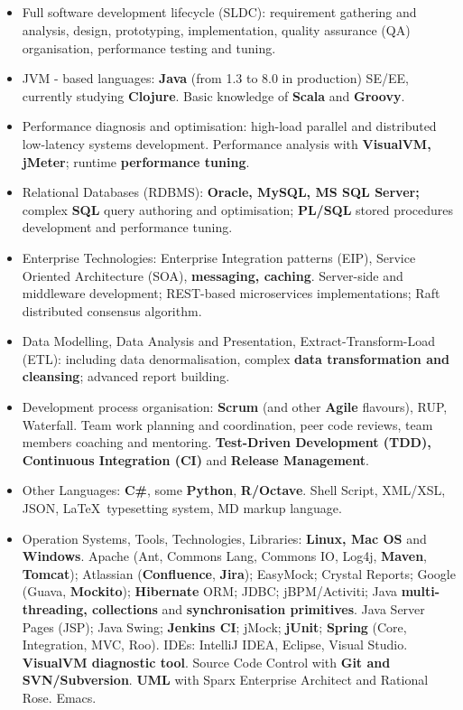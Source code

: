 \documentclass{res}
\newcommand{\osection}[1]{\section{\sc {\Large \textbf{#1}\\}} \vspace{0.30cm}}
\newcommand{\profileItem}[2]{\item {\sc #1:} #2.}
\newcommand{\emp}[1]{{\bf#1}}
\newif\ifFullVersion
\begin{document}
\begin{resume}
\osection{Technical Profile}
\vspace{0.20cm}
\begin{itemize}
  \profileItem {Full software development lifecycle (SLDC)} {requirement gathering and analysis, design, prototyping, implementation, quality assurance (QA) organisation, performance testing and tuning}
\ifFullVersion
  \profileItem {Development process organisation} {\emp{Scrum} (and other \emp{Agile} flavours), RUP, Waterfall. Team work planning and coordination, peer code reviews, team members coaching and mentoring. \emp{Continuous Integration (CI)} and \emp{Release Management}}
\fi
  \profileItem {JVM - based languages} {\emp{Java} (from 1.3 to 8.0 in production) SE/EE, currently studying \emp{Clojure}. Basic knowledge of \emp{Scala} and \emp{Groovy}}
  \profileItem{Performance diagnosis and optimisation} {high-load parallel and distributed low-latency systems development. Performance analysis with \emp{VisualVM, jMeter}; runtime \emp{performance tuning}}
  \profileItem {Relational Databases (RDBMS)} {\emp{Oracle, MySQL, MS SQL Server;} complex \emp{SQL} query authoring and optimisation; \emp{PL/SQL} stored procedures development and performance tuning}
  \profileItem{Enterprise Technologies} {Enterprise Integration patterns (EIP), Service Oriented Architecture (SOA), \emp{messaging, caching}. Server-side and middleware development; REST-based microservices implementations; Raft distributed consensus algorithm}
  \profileItem{Data Modelling, Data Analysis and Presentation, Extract-Transform-Load (ETL)} {including data denormalisation, complex \emp{data transformation and cleansing}; advanced report building}
\ifFullVersion
Strong interest in \emp{functional programming}, Data Science and Machine Learning / Business Intelligence systems.
\else
  \profileItem{Development process organisation} {\emp{Scrum} (and other \emp{Agile} flavours), RUP, Waterfall. Team work planning and coordination, peer code reviews, team members coaching and mentoring. \emp{Test-Driven Development (TDD), Continuous Integration (CI)} and \emp{Release Management}}
\fi
  \profileItem{Other Languages} {\emp{C\#}, some \emp{Python}, \emp{R/Octave}. Shell Script, XML/XSL, JSON, \LaTeX ~typesetting system, MD markup language}
  \profileItem{Operation Systems, Tools, Technologies, Libraries} {\emp{Linux, Mac OS} and \emp{Windows}. Apache (Ant, Commons Lang, Commons IO, Log4j, \emp{Maven}, \emp{Tomcat}); Atlassian (\emp{Confluence}, \emp{Jira}); EasyMock; Crystal Reports; Google (Guava, \emp{Mockito}); \emp{Hibernate} ORM; JDBC; jBPM/Activiti; Java \emp{multi-threading, collections} and \emp{synchronisation primitives}. Java Server Pages (JSP); Java Swing; \emp{Jenkins CI}; jMock; \emp{jUnit}; \emp{Spring} (Core, Integration, MVC, Roo). IDEs: IntelliJ IDEA, Eclipse, Visual Studio. \emp{VisualVM diagnostic tool}. Source Code Control with \emp{Git and SVN/Subversion}. \emp{UML} with Sparx Enterprise Architect and Rational Rose. Emacs}


\end{itemize}
\end{resume}
\end{document}
